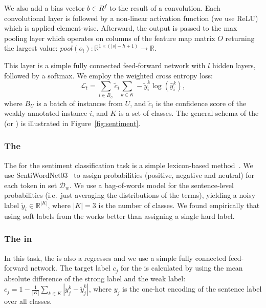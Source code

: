 We also add a bias vector $b \in R^f$ to the result of a convolution.
Each convolutional layer is followed by a non-linear activation function (we use ReLU\cite{Nair:2010}) which is applied element-wise. Afterward, the output is passed to the max pooling layer which operates on columns of the feature map matrix $O$ returning the largest value: $pool(o_i) : \mathbb{R}^{1\times(|s|-h+1)} \rightarrow \mathbb{R}$.

This layer is a simple fully connected feed-forward network with $l$ hidden layers, followed by a softmax.  We employ the weighted cross entropy loss:
\begin{equation}
\mathcal{L}_t = \sum_{i\in B_U} \tilde{c}_i \sum_{k \in K} - \tilde{y}_i^k \log (\hat{y}_i^k),
\end{equation}
where $B_U$ is a batch of instances from $U$, and $\tilde{c}_i$ is the confidence score of the weakly annotated instance $i$, and $K$ is a set of classes. 
The general schema of the \tnet (or \std) is illustrated in Figure~\ref{fig:sentiment}.

\subsubsection{The \wa}
\label{sentiment-WA}
The \wa for the sentiment classification task is a simple lexicon-based method~\citep{Hamdan:2013,Kiritchenko:2014}.
We use SentiWordNet03~\citep{Gaccianella:2010} to assign probabilities (positive, negative and neutral) for each token in set $\mathcal{D}_w$. We use a bag-of-words model for the sentence-level probabilities (i.e.\ just averaging the distributions of the terms), yielding a noisy label $\tilde{y}_i \in \mathbb{R}^{|K|}$, where $|K|=3$ is the number of classes.  We found empirically that using soft labels from the \wa works better than assigning a single hard label.


\subsubsection{The \cnet in \cws}
In this task, the \cnet is also a regresses and we use a simple fully connected feed-forward network. The target label $c_j$ for the \cnet is calculated by using the mean absolute difference of the strong label and the weak label: $c_j= 1-\frac{1}{|K|}\sum_{k\in K}|y_j^k - \tilde{y}_j^k|$, where $y_j$ is the one-hot encoding of the sentence label over all classes.


